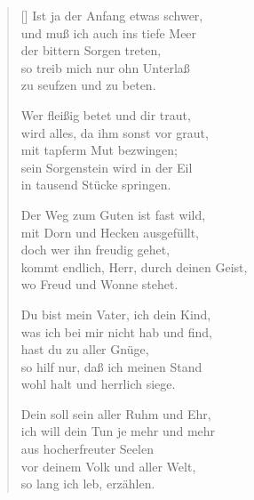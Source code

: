 \begin{multicols}{2}
\begin{verse}[\versewidth]
 Ist ja der Anfang etwas schwer,\\
und muß ich auch ins tiefe Meer\\
der bittern Sorgen treten,\\
so treib mich nur ohn Unterlaß\\
zu seufzen und zu beten.

 Wer fleißig betet und dir traut,\\
wird alles, da ihm sonst vor graut,\\
mit tapferm Mut bezwingen;\\
sein Sorgenstein wird in der Eil\\
in tausend Stücke springen.

 Der Weg zum Guten ist fast wild,\\
mit Dorn und Hecken ausgefüllt,\\
doch wer ihn freudig gehet,\\
kommt endlich, Herr, durch deinen Geist,\\
wo Freud und Wonne stehet.

 Du bist mein Vater, ich dein Kind,\\
was ich bei mir nicht hab und find,\\
hast du zu aller Gnüge,\\
so hilf nur, daß ich meinen Stand\\
wohl halt und herrlich siege.

 Dein soll sein aller Ruhm und Ehr,\\
ich will dein Tun je mehr und mehr\\
aus hocherfreuter Seelen\\
vor deinem Volk und aller Welt,\\
so lang ich leb, erzählen.

\end{verse}
\end{multicols}
